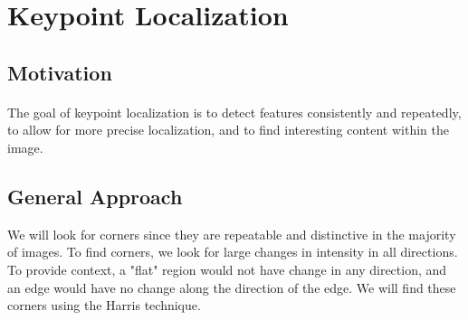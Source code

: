 \documentclass{article}
\begin{document}
\section{Keypoint Localization}
\subsection{Motivation}
\paragraph{} The goal of keypoint localization is to detect features consistently and repeatedly, to allow for more precise localization, and to find interesting content within the image.

\subsection{General Approach}
We will look for corners since they are repeatable and distinctive in the majority of images. To find corners, we look for large changes in intensity in all directions. To provide context, a "flat" region would not have change in any direction, and an edge would have no change along the direction of the edge. We will find these corners using the Harris technique.
\end{document}
